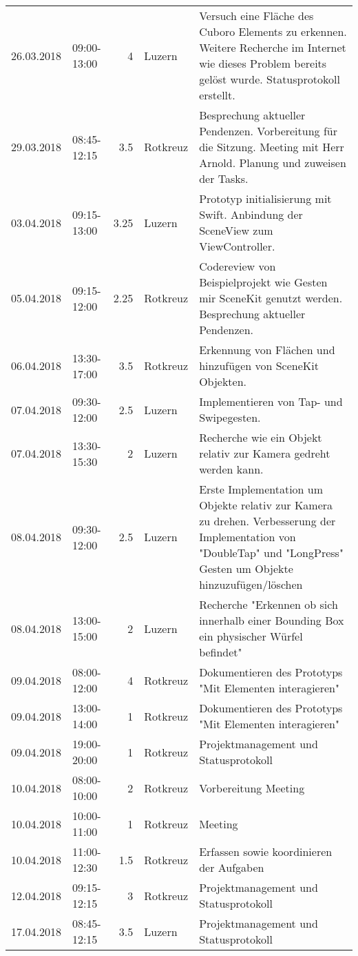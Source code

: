 \begin{longtable}{llrlp{7cm}}
	26.03.2018 & 09:00-13:00 & 4      & Luzern & Versuch eine Fläche des Cuboro Elements zu erkennen. Weitere Recherche im Internet wie dieses Problem bereits gelöst wurde. Statusprotokoll erstellt. \\
	29.03.2018 & 08:45-12:15 & 3.5      & Rotkreuz & Besprechung aktueller Pendenzen. Vorbereitung für die Sitzung. Meeting mit Herr Arnold. Planung und zuweisen der Tasks. \\
	03.04.2018 & 09:15-13:00 & 3.25      & Luzern & Prototyp initialisierung mit Swift. Anbindung der SceneView zum ViewController. \\
	05.04.2018 & 09:15-12:00 & 2.25      & Rotkreuz & Codereview von Beispielprojekt wie Gesten mir SceneKit genutzt werden. Besprechung aktueller Pendenzen. \\
	06.04.2018 & 13:30-17:00 & 3.5      & Rotkreuz & Erkennung von Flächen und hinzufügen von SceneKit Objekten. \\
	07.04.2018 & 09:30-12:00 & 2.5      & Luzern & Implementieren von Tap- und Swipegesten. \\
	07.04.2018 & 13:30-15:30 & 2      & Luzern & Recherche wie ein Objekt relativ zur Kamera gedreht werden kann. \\
	08.04.2018 & 09:30-12:00 & 2.5      & Luzern & Erste Implementation um Objekte relativ zur Kamera zu drehen. Verbesserung der Implementation von "DoubleTap" und "LongPress" Gesten um Objekte hinzuzufügen/löschen \\
	08.04.2018 & 13:00-15:00 & 2      & Luzern & Recherche "Erkennen ob sich innerhalb einer Bounding Box ein physischer Würfel befindet" \\
	09.04.2018 & 08:00-12:00 & 4      & Rotkreuz & Dokumentieren des Prototyps "Mit Elementen interagieren" \\
	09.04.2018 & 13:00-14:00 & 1      & Rotkreuz & Dokumentieren des Prototyps "Mit Elementen interagieren" \\
	09.04.2018 & 19:00-20:00 & 1      & Rotkreuz & Projektmanagement und Statusprotokoll \\
	10.04.2018 & 08:00-10:00 & 2      & Rotkreuz & Vorbereitung Meeting \\
	10.04.2018 & 10:00-11:00 & 1      & Rotkreuz & Meeting \\
	10.04.2018 & 11:00-12:30 & 1.5    & Rotkreuz & Erfassen sowie koordinieren der Aufgaben \\
	12.04.2018 & 09:15-12:15 & 3      & Rotkreuz & Projektmanagement und Statusprotokoll \\
	17.04.2018 & 08:45-12:15 & 3.5      & Luzern & Projektmanagement und Statusprotokoll \\

\end{longtable}
